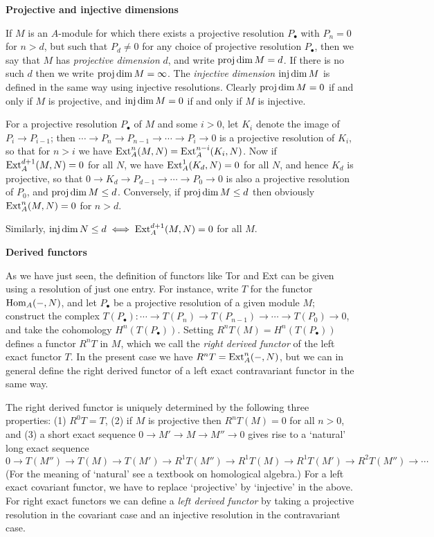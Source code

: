 \medskip
\noindent\textbf{Projective and injective dimensions}

If $M$ is an $A$-module for which there exists a projective resolution $P_\bullet$ with
$P_n = 0$ for $n > d$, but such that $P_d \ne 0$ for any choice of projective resolution
$P_\bullet$, then we say that $M$ has \emph{projective dimension} $d$, and write
$\operatorname{proj\,dim} M = d$. If there is no such $d$ then we write $\operatorname{proj\,dim} M = \infty$. The
\emph{injective dimension} $\operatorname{inj\,dim} M$ is defined in the same way using injective
resolutions. Clearly $\operatorname{proj\,dim} M = 0$ if and only if $M$ is projective, and
$\operatorname{inj\,dim} M = 0$ if and only if $M$ is injective.

For a projective resolution $P_\bullet$ of $M$ and some $i > 0$, let $K_i$ denote the image of
$P_i \to P_{i-1}$; then $\cdots \to P_n \to P_{n-1} \to \cdots \to P_i \to 0$ is a projective
resolution of $K_i$, so that for $n > i$ we have $\operatorname{Ext}^n_A(M, N) = \operatorname{Ext}^{n-i}_A(K_i, N)$.
Now if $\operatorname{Ext}^{d+1}_A(M, N) = 0$ for all $N$, we have $\operatorname{Ext}^1_A(K_d, N) = 0$ for all $N$, and
hence $K_d$ is projective, so that $0 \to K_d \to P_{d-1} \to \cdots \to P_0 \to 0$ is also
a projective resolution of $P_0$, and $\operatorname{proj\,dim} M \le d$. Conversely, if
$\operatorname{proj\,dim} M \le d$ then obviously $\operatorname{Ext}^n_A(M, N) = 0$ for $n > d$.

Similarly, $\operatorname{inj\,dim} N \le d \iff \operatorname{Ext}^{d+1}_A(M, N) = 0$ for all $M$.

\medskip
\noindent\textbf{Derived functors}

As we have just seen, the definition of functors like Tor and Ext can be given
using a resolution of just one entry. For instance, write $T$ for the functor
$\operatorname{Hom}_A(-, N)$, and let $P_\bullet$ be a projective resolution of a given module $M$;
construct the complex $T(P_\bullet)\colon \cdots \to T(P_n) \to T(P_{n-1}) \to \cdots \to T(P_0) \to 0$,
and take the cohomology $H^n(T(P_\bullet))$. Setting $R^nT(M) = H^n(T(P_\bullet))$ defines
a functor $R^nT$ in $M$, which we call the \emph{right derived functor} of the left exact
functor $T$. In the present case we have $R^nT = \operatorname{Ext}^n_A(-, N)$, but we can in
general define the right derived functor of a left exact contravariant functor
in the same way.

The right derived functor is uniquely determined by the following three
properties: (1) $R^0T = T$, (2) if $M$ is projective then $R^nT(M) = 0$ for all $n > 0$,
and (3) a short exact sequence $0 \to M' \to M \to M'' \to 0$ gives rise to a `natural'
long exact sequence
\[
  0 \to T(M'') \to T(M) \to T(M')
  \to R^1T(M'') \to R^1T(M) \to R^1T(M')
  \to R^2T(M'') \to \cdots
\]
(For the meaning of `natural' see a textbook on homological algebra.) For a
left exact covariant functor, we have to replace `projective' by `injective' in
the above. For right exact functors we can define a \emph{left derived functor} by
taking a projective resolution in the covariant case and an injective resolution
in the contravariant case.


